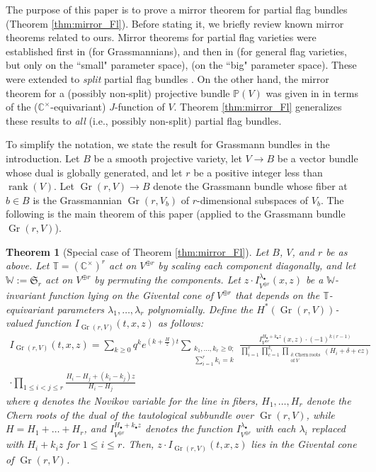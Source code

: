 \documentclass[a4paper,12pt]{amsart}
\numberwithin{equation}{section}
\newtheorem{theorem}{Theorem}[section]
\theoremstyle{definition}
\newcommand{\C}{\mathbb{C}}
\newcommand{\PP}{\mathbb{P}}
\newcommand{\T}{\mathbb{T}}
\newcommand{\W}{\mathbb{W}}
\newcommand{\rank}{\operatorname{rank}}
\newcommand{\Gr}{\operatorname{Gr}}
\begin{document}
The purpose of this paper is to prove a mirror theorem for partial flag bundles (Theorem \ref{thm:mirror_Fl}).
Before stating it, we briefly review known mirror theorems related to ours.
Mirror theorems for partial flag varieties were established first in \cite{BCFK:two} (for Grassmannians), and then in \cite{BCFK:ab/nonab} (for general flag varieties, but only on the ``small" parameter space), \cite{CFKS} (on the ``big" parameter space).
These were extended to {\it split} partial flag bundles \cite{Oh:split_flag_bundle}.
On the other hand, the mirror theorem for a (possibly non-split) projective bundle $\PP(V)$ was given in \cite{IK:quantum} in terms of the ($\C^\times$-equivariant) $J$-function of $V$.
Theorem \ref{thm:mirror_Fl} generalizes these results to {\it all} (i.e., possibly non-split) partial flag bundles.

To simplify the notation, we state the result for Grassmann bundles in the introduction.
Let $B$ be a smooth projective variety, let $V\to B$ be a vector bundle whose dual is globally generated, and let $r$ be a positive integer less than $\rank(V)$.
Let $\Gr(r,V)\to B$ denote the Grassmann bundle whose fiber at $b\in B$ is the Grassmannian $\Gr(r,V_b)$ of $r$-dimensional subspaces of $V_b$.
The following is the main theorem of this paper (applied to the Grassmann bundle $\Gr(r,V)$).

\begin{theorem}[Special case of Theorem \ref{thm:mirror_Fl}]\label{thm:mirror_Gr}
    Let $B$, $V$, and $r$ be as above.
    Let $\T=(\C^\times)^r$ act on $V^{\oplus r}$ by scaling each component diagonally, and let $\W:=\mathfrak{S}_r$ act on $V^{\oplus r}$ by permuting the components.    
    Let $z\cdot I^{\lambda_\bullet}_{V^{\oplus r}}(x,z)$ be a $\W$-invariant function lying on the Givental cone of $V^{\oplus r}$ that depends on the $\T$-equivariant parameters $\lambda_1,\dots,\lambda_r$ polynomially.
    Define the $H^*(\Gr(r,V))$-valued function $I_{\Gr(r,V)}(t,x,z)$ as follows:
    \begin{multline*}
    I_{\Gr(r,V)}(t,x,z) = \sum_{k\geq0} q^ke^{\left(k+\frac{H}{z}\right)t} \sum_{ \substack{k_1,\dots,k_r\geq0; \\ \sum_{i=1}^rk_i=k } } \frac{ I^{H_\bullet+k_\bullet z}_{V^{\oplus r}}(x,z)\cdot(-1)^{k(r-1)} }{\prod_{i=1}^{r} \prod_{c=1}^{k_i} \prod_{ \substack{\delta\colon\mathrm{Chern\ roots} \\ \mathrm{of\ } V} } (H_i + \delta + cz)}	\\
    \cdot \prod_{1\leq i<j\leq r}\frac{H_i-H_j+(k_i-k_j)z}{H_i-H_j}
    \end{multline*}
    where $q$ denotes the Novikov variable for the line in fibers, $H_1,\dots,H_r$ denote the Chern roots of the dual of the tautological subbundle over $\Gr(r,V)$, while $H=H_1+\dots +H_r$, and $I^{H_\bullet+k_\bullet z}_{V^{\oplus r}}$ denotes the function $I^{\lambda_\bullet}_{V^{\oplus r}}$ with each $\lambda_i$ replaced with $H_i+k_iz$ for $1\leq i\leq r$.
    Then, $z\cdot I_{\Gr(r,V)}(t,x,z)$ lies in the Givental cone of $\Gr(r,V)$.
\end{theorem}
\end{document}
